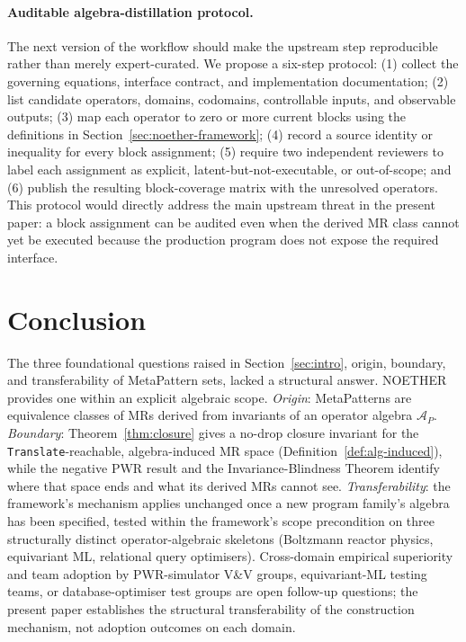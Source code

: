 \documentclass[manuscript]{acmart}
\begin{document}
\paragraph{Auditable algebra-distillation protocol.}
The next version of the workflow should make the upstream step reproducible
rather than merely expert-curated. We propose a six-step protocol: (1) collect
the governing equations, interface contract, and implementation documentation;
(2) list candidate operators, domains, codomains, controllable inputs, and
observable outputs; (3) map each operator to zero or more current blocks using
the definitions in Section~\ref{sec:noether-framework}; (4) record a source
identity or inequality for every block assignment; (5) require two independent
reviewers to label each assignment as explicit, latent-but-not-executable, or
out-of-scope; and (6) publish the resulting block-coverage matrix with the
unresolved operators. This protocol would directly address the main upstream
threat in the present paper: a block assignment can be audited even when the
derived MR class cannot yet be executed because the production program does not
expose the required interface.

\section{Conclusion}
\label{sec:conclusion}

The three foundational questions raised in Section~\ref{sec:intro}, origin,
boundary, and transferability of MetaPattern sets, lacked a structural answer.
NOETHER provides one within an explicit algebraic scope. \emph{Origin}:
MetaPatterns are equivalence classes of MRs derived from invariants of an
operator algebra $\mathcal{A}_P$. \emph{Boundary}: Theorem~\ref{thm:closure}
gives a no-drop closure invariant for the \texttt{Translate}-reachable,
algebra-induced MR space (Definition~\ref{def:alg-induced}), while the negative
PWR result and the Invariance-Blindness Theorem identify where that space ends
and what its derived MRs cannot see. \emph{Transferability}: the framework's
mechanism applies unchanged once a new program family's algebra has been
specified, tested within the framework's scope precondition on three
structurally distinct operator-algebraic skeletons (Boltzmann reactor physics,
equivariant ML, relational query optimisers). Cross-domain empirical superiority
and team adoption by PWR-simulator V\&V groups, equivariant-ML testing teams, or
database-optimiser test groups are open follow-up questions; the present paper
establishes the structural transferability of the construction mechanism, not
adoption outcomes on each domain.
\end{document}
